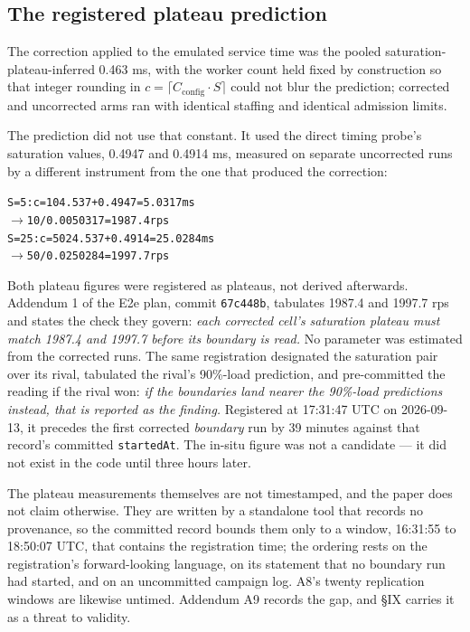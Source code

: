\documentclass{ieeeaccess}
\begin{document}
\subsection{The registered plateau prediction}

The correction applied to the emulated service time was the pooled saturation-plateau-inferred 0.463 ms, with the worker count held fixed by construction so that integer rounding in $c = \lceil C_{\mathrm{config}} \cdot S \rceil$ could not blur the prediction; corrected and uncorrected arms ran with identical staffing and identical admission limits.

The prediction did not use that constant. It used the direct timing probe's saturation values, 0.4947 and 0.4914 ms, measured on separate uncorrected runs by a different instrument from the one that produced the correction:

{\footnotesize\begin{alltt}
S = 5:   c = 10   4.537 + 0.4947 = 5.0317 ms
         \ensuremath{\rightarrow}  10 / 0.0050317 = 1987.4 rps
S = 25:  c = 50   24.537 + 0.4914 = 25.0284 ms
         \ensuremath{\rightarrow}  50 / 0.0250284 = 1997.7 rps
\end{alltt}}

Both plateau figures were registered as plateaus, not derived afterwards. Addendum 1 of the E2e plan, commit \texttt{67c448b}, tabulates 1987.4 and 1997.7 rps and states the check they govern: \textit{each corrected cell's saturation plateau must match 1987.4 and 1997.7 before its boundary is read.} No parameter was estimated from the corrected runs. The same registration designated the saturation pair over its rival, tabulated the rival's 90\%-load prediction, and pre-committed the reading if the rival won: \textit{if the boundaries land nearer the 90\%-load predictions instead, that is reported as the finding.} Registered at 17:31:47 UTC on 2026-09-13, it precedes the first corrected \textit{boundary} run by 39 minutes against that record's committed \texttt{startedAt}. The in-situ figure was not a candidate --- it did not exist in the code until three hours later.

The plateau measurements themselves are not timestamped, and the paper does not claim otherwise. They are written by a standalone tool that records no provenance, so the committed record bounds them only to a window, 16:31:55 to 18:50:07 UTC, that contains the registration time; the ordering rests on the registration's forward-looking language, on its statement that no boundary run had started, and on an uncommitted campaign log. A8's twenty replication windows are likewise untimed. Addendum A9 records the gap, and \S{}IX carries it as a threat to validity.
\end{document}
